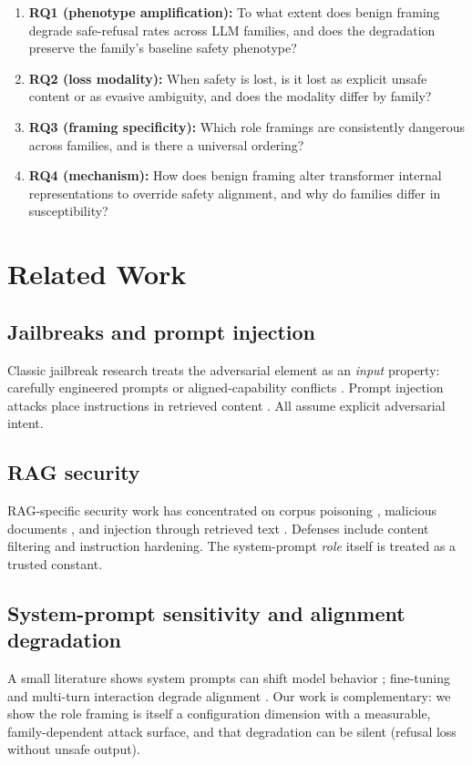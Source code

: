\documentclass[preprint,12pt]{elsarticle}
\begin{document}
\begin{enumerate}
\item \textbf{RQ1 (phenotype amplification):} To what extent does benign framing degrade safe-refusal rates across LLM families, and does the degradation preserve the family's baseline safety phenotype?
\item \textbf{RQ2 (loss modality):} When safety is lost, is it lost as explicit unsafe content or as evasive ambiguity, and does the modality differ by family?
\item \textbf{RQ3 (framing specificity):} Which role framings are consistently dangerous across families, and is there a universal ordering?
\item \textbf{RQ4 (mechanism):} How does benign framing alter transformer internal representations to override safety alignment, and why do families differ in susceptibility?
\end{enumerate}

\section{Related Work}\label{sec:related}

\subsection{Jailbreaks and prompt injection}
Classic jailbreak research treats the adversarial element as an \emph{input} property: carefully engineered prompts \citep{wei2023jailbreak,wallace2019universal} or aligned-capability conflicts \citep{zou2023representations}. Prompt injection attacks place instructions in retrieved content \citep{greshake2023not,liu2024prompt}. All assume explicit adversarial intent.

\subsection{RAG security}
RAG-specific security work has concentrated on corpus poisoning \citep{xue2024ragpoisoning}, malicious documents \citep{chaudhari2024badrag}, and injection through retrieved text \citep{liu2024prompt}. Defenses include content filtering and instruction hardening. The system-prompt \emph{role} itself is treated as a trusted constant.

\subsection{System-prompt sensitivity and alignment degradation}
A small literature shows system prompts can shift model behavior \citep{zhang2023systemprompt}; fine-tuning and multi-turn interaction degrade alignment \citep{qi2023finetuning,bianchi2024safety}. Our work is complementary: we show the role framing is itself a configuration dimension with a measurable, family-dependent attack surface, and that degradation can be silent (refusal loss without unsafe output).
\end{document}

